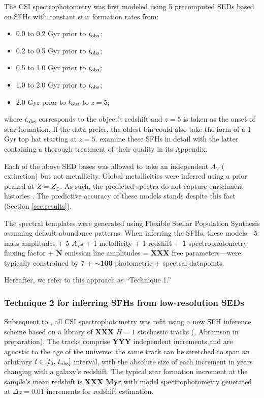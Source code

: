 \documentclass[a4paper,fleqn,usenatbib]{mnras}
\newcommand{\bfr}{\bf\color{red}}
\newcommand{\tobs}{t_{\rm obs}}
\newcommand{\bitem}{\begin{itemize}}
\newcommand{\eitem}{\end{itemize}}
\begin{document}
The CSI spectrophotometry was first modeled using 5 precomputed SEDs based on SFHs with 
constant star formation rates from:
\bitem
	\item 0.0 to 0.2 Gyr prior to $\tobs$;
	\item 0.2 to 0.5 Gyr prior to $\tobs$;
	\item 0.5 to 1.0 Gyr prior to $\tobs$;
	\item 1.0 to 2.0 Gyr prior to $\tobs$;
	\item 2.0 Gyr prior to $\tobs$ to $z=5$;
\eitem
where $\tobs$ corresponds to the object's redshift and $z=5$ is taken as the onset of star formation. If 
the data prefer, the oldest bin could also take the form of a 1 Gyr top hat starting at $z=5$. 
\citet{Dressler16, Dressler18} examine these SFHs in detail with the latter containing a thorough 
treatment of their quality in its Appendix.

Each of the above SED bases was allowed to take an independent $A_{V}$ (\citealt{Calzetti00} 
extinction) but not metallicity. Global metallicities were inferred using a prior peaked at 
$Z=Z_{\odot}$. As such, the predicted spectra do not capture enrichment histories 
\citep[cf.][]{Pacifici12, Morishita19}. The predictive accuracy of these models stands despite this fact (Section \ref{sec:results}).

The spectral templates were generated using Flexible Stellar Population Synthesis 
\citep[FSPS;][]{ConroyGunnWhite09} assuming default abundance patterns. When inferring the SFHs, 
these models---5 mass amplitudes + 5 $A_{V}$s + 1 metallicity + 1 redshift + {\bfr 1} spectrophotometry fluxing 
factor + {\bfr N} emission line amplitudes = {\bfr XXX} free parameters---were typically constrained by 
7 + {\bfr $\sim$100} photometric + spectral datapoints.

Hereafter, we refer to this approach as ``Technique 1.''

\subsubsection{Technique 2 for inferring SFHs from low-resolution SEDs}
\label{sec:h1}

Subsequent to \citet{Dressler18}, all CSI spectrophotometry was refit using a new 
SFH inference scheme based on a library of {\bfr XXX} $H=1$ stochastic tracks
(\citealt{Kelson14,Kelson16,Kelson19}, Abramson in preparation). The tracks comprise {\bfr YYY} 
independent increments and are agnostic to the age of the universe: the same track can be stretched 
to span an arbitrary $t\in[t_{0},\,\tobs]$ interval, with the absolute size of each increment in years 
changing with a galaxy's redshift. The typical star formation increment at the sample's mean redshift 
is {\bfr XXX Myr} with model spectrophotometry generated at {\bfr $\Delta z = 0.01$} increments for
redshift estimation.
\end{document}
